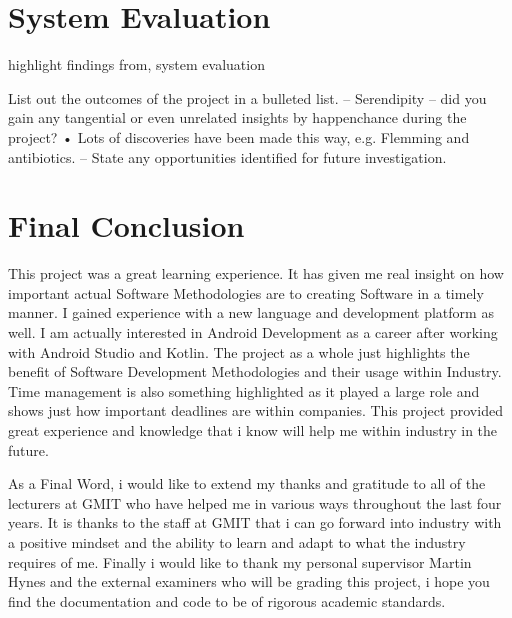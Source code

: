 \bigskip

\section{System Evaluation}
highlight findings from, system evaluation

List out the outcomes of the project in a bulleted list.
– Serendipity – did you gain any tangential or even unrelated insights
by happenchance during the project?
• Lots of discoveries have been made this way, e.g. Flemming
and antibiotics.
– State any opportunities identified for future investigation.
\bigskip

\section{Final Conclusion}
This project was a great learning experience. It has given me real insight on how important actual Software Methodologies are to creating Software in a timely manner. I gained experience with a new language and development platform as well. I am actually interested in Android Development as a career after working with Android Studio and Kotlin. The project as a whole just highlights the benefit of Software Development Methodologies and their usage within Industry. Time management is also something highlighted as it played a large role and shows just how important deadlines are within companies. This project provided great experience and knowledge that i know will help me within industry in the future.\newline

As a Final Word, i would like to extend my thanks and gratitude to all of the lecturers at GMIT who have helped me in various ways throughout the last four years. It is thanks to the staff at GMIT that i can go forward into industry with a positive mindset and the ability to learn and adapt to what the industry requires of me. Finally i would like to thank my personal supervisor Martin Hynes and the external examiners who will be grading this project, i hope you find the documentation and code to be of rigorous academic standards.
\bigskip